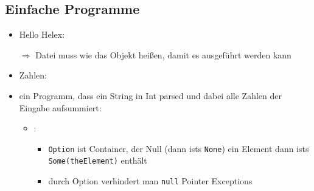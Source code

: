 \subsection{Einfache Programme}
\begin{itemize}
  \item Hello Helex:
  
  
  
  $\Rightarrow$ Datei muss wie das Objekt heißen, damit es ausgeführt werden
  kann
  \item Zahlen:
  
  
  
  \item ein Programm, dass ein String in Int parsed und dabei alle Zahlen 
  der Eingabe aufsummiert:
  
  
  
  \begin{itemize}
    \item {}:
    \begin{itemize}
      \item \texttt{Option} ist Container, der Null (dann ists 
      \texttt{None}) \oder ein Element dann ists \texttt{Some(theElement)}
      enthält
      \item durch Option verhindert man \texttt{null} Pointer Exceptions
      

\end{itemize}
\end{itemize}
\end{itemize}
